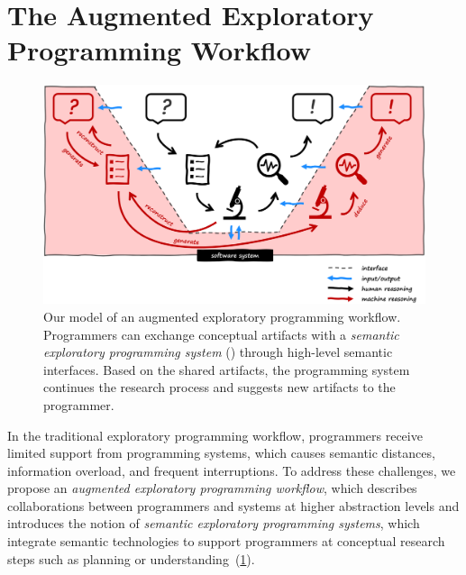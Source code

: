 
\section{The Augmented Exploratory Programming Workflow}
\label{sec:approach/workflow}

\begin{figure}
	\centering
	\includegraphics[width=\textwidth]{01_workflow/workflow.png}
	\caption[Our model of an \emph{augmented exploratory programming workflow}.]{
		Our model of an augmented exploratory programming workflow.
		Programmers can exchange conceptual artifacts with a \emph{semantic exploratory programming system} (\bold{\textcolor[HTML]{c00000}{red}}) through high-level semantic interfaces.
		Based on the shared artifacts, the programming system continues the research process and suggests new artifacts to the programmer.
	}
	\label{fig:approach/workflow/workflow}
\end{figure}

In the traditional exploratory programming workflow, programmers receive limited support from programming systems, which causes semantic distances, information overload, and frequent interruptions.
To address these challenges, we propose an \emph{augmented exploratory programming workflow}, which describes collaborations between programmers and systems at higher abstraction levels and introduces the notion of \emph{semantic exploratory programming systems}, which integrate semantic technologies to support programmers at conceptual research steps such as planning or understanding~(\cref{fig:approach/workflow/workflow}).


